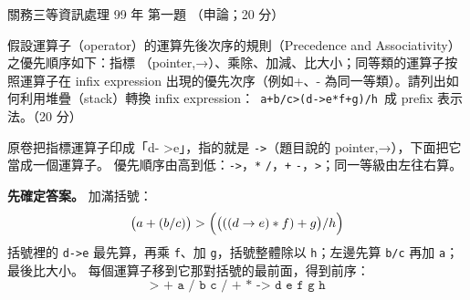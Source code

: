 \begin{pastexam}[label={px:gw3-099-ds-01}]{關務三等資訊處理 99 年 第一題}
（申論；20 分）

假設運算子（operator）的運算先後次序的規則（Precedence and Associativity）之優先順序如下：指標
（pointer,→）、乘除、加減、比大小；同等類的運算子按照運算子在 infix expression 出現的優先次序（例如+、-
為同一等類）。請列出如何利用堆疊（stack）轉換 infix expression：\ \texttt{a+b/c>(d->e*f+g)/h}\ 成 prefix
表示法。（20 分）
\end{pastexam}

\begin{pastsoln}
原卷把指標運算子印成「d- >e」，指的就是 \texttt{->}（題目說的 pointer,→），下面把它當成一個運算子。
優先順序由高到低：\texttt{->}，\texttt{*} \texttt{/}，\texttt{+} \texttt{-}，\texttt{>}；同一等級由左往右算。

\textbf{先確定答案。} 加滿括號：
\[
\bigl(a + (b / c)\bigr) > \Bigl(\bigl(((d \to e) * f) + g\bigr) / h\Bigr)
\]
括號裡的 \texttt{d->e} 最先算，再乘 \texttt{f}、加 \texttt{g}，括號整體除以 \texttt{h}；左邊先算
\texttt{b/c} 再加 \texttt{a}；最後比大小。 每個運算子移到它那對括號的最前面，得到前序：
\[
\texttt{> + a / b c / + * -> d e f g h}
\]


\end{pastsoln}
